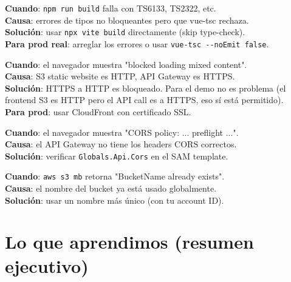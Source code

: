 \documentclass[11pt,a4paper,oneside]{article}
\begin{document}
\begin{tcolorbox}[colback=errred!5!white,colframe=errred,breakable,title={Error 3: TypeScript errors bloquean el build}]
\textbf{Cuando}: \texttt{npm run build} falla con TS6133, TS2322, etc. \\
\textbf{Causa}: errores de tipos no bloqueantes pero que vue-tsc rechaza. \\
\textbf{Soluci\'on}: usar \texttt{npx vite build} directamente (skip type-check). \\
\textbf{Para prod real}: arreglar los errores o usar \texttt{vue-tsc -{}-noEmit false}.
\end{tcolorbox}

\begin{tcolorbox}[colback=errred!5!white,colframe=errred,breakable,title={Error 4: Mixed content (HTTP/HTTPS)}]
\textbf{Cuando}: el navegador muestra "blocked loading mixed content". \\
\textbf{Causa}: S3 static website es HTTP, API Gateway es HTTPS. \\
\textbf{Soluci\'on}: HTTPS a HTTP es bloqueado. Para el demo no es problema (el frontend S3 es HTTP pero el API call es a HTTPS, eso s\'i est\'a permitido). \\
\textbf{Para prod}: usar CloudFront con certificado SSL.
\end{tcolorbox}

\begin{tcolorbox}[colback=errred!5!white,colframe=errred,breakable,title={Error 5: CORS preflight fails}]
\textbf{Cuando}: el navegador muestra "CORS policy: ... preflight ...". \\
\textbf{Causa}: el API Gateway no tiene los headers CORS correctos. \\
\textbf{Soluci\'on}: verificar \texttt{Globals.Api.Cors} en el SAM template.
\end{tcolorbox}

\begin{tcolorbox}[colback=errred!5!white,colframe=errred,breakable,title={Error 6: S3 bucket name already taken}]
\textbf{Cuando}: \texttt{aws s3 mb} retorna "BucketName already exists". \\
\textbf{Causa}: el nombre del bucket ya est\'a usado globalmente. \\
\textbf{Soluci\'on}: usar un nombre m\'as \'unico (con tu account ID).
\end{tcolorbox}

\section{Lo que aprendimos (resumen ejecutivo)}
\end{document}
